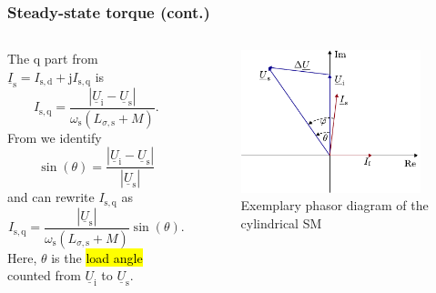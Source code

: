 \begin{frame}
	\frametitle{Steady-state torque (cont.)}
    \begin{columns}
		\begin{column}{0.55\textwidth}
		\onslide<+->
		The q part from $\underline{I}_\mathrm{s}=I_\mathrm{s,d} + \mathrm{j}I_\mathrm{s,q}$ is
		\begin{equation}
			I_\mathrm{s,q} = \frac{\left|\underline{U}_\mathrm{i} - \underline{U}_\mathrm{s}\right|}{\omega_\mathrm{s} \left(L_{\sigma,\mathrm{s}} + M\right)}.
		\end{equation}
		\onslide<+->
		From  we identify 
		$$\sin(\theta) = \frac{\left|\underline{U}_\mathrm{i} - \underline{U}_\mathrm{s}\right|}{\left|\underline{U}_\mathrm{s}\right|}$$
		\onslide<+->
		and can rewrite $I_\mathrm{s,q}$ as
		\begin{equation}
			I_\mathrm{s,q} = \frac{\left|\underline{U}_\mathrm{s}\right|}{\omega_\mathrm{s} \left(L_{\sigma,\mathrm{s}} + M\right)} \sin(\theta).
		\end{equation}
		\onslide<+->
		Here, $\theta$ is the \hl{load angle} counted from $\underline{U}_\mathrm{i}$ to $\underline{U}_\mathrm{s}$.
        \end{column}
        \begin{column}{0.45\textwidth}
			\onslide<2->
            \begin{figure}
                \centering
                \includegraphics[width=0.95\textwidth]{fig/lec07/Load_angle_voltage_phasors.pdf}
                \caption{Exemplary phasor diagram of the cylindrical SM}
                \label{fig:Load_angle_voltage_phasors}
            \end{figure}
        \end{column}
    \end{columns}
\end{frame}

